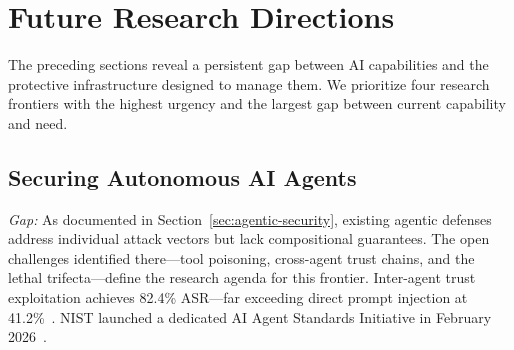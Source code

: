 
\section{Future Research Directions}
\label{sec:future}

The preceding sections reveal a persistent gap between AI capabilities and the protective infrastructure designed to manage them. We prioritize four research frontiers with the highest urgency and the largest gap between current capability and need.


\subsection{Securing Autonomous AI Agents}
\label{sec:future-agents}


\emph{Gap:} As documented in Section~\ref{sec:agentic-security}, existing agentic defenses address individual attack vectors but lack compositional guarantees. The open challenges identified there---tool poisoning, cross-agent trust chains, and the lethal trifecta---define the research agenda for this frontier. Inter-agent trust exploitation achieves 82.4\% ASR---far exceeding direct prompt injection at 41.2\%~\cite{darkside2025agents}. NIST launched a dedicated AI Agent Standards Initiative in February 2026~\cite{nist2026agentstandards}.

